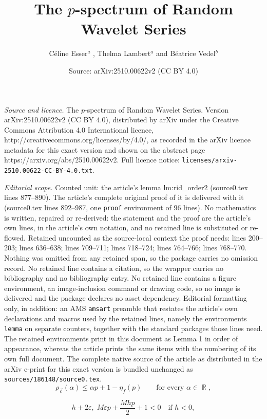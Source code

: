 \documentclass[10pt,a4paper]{amsart}
\title{The $p$-spectrum of Random Wavelet Series}
\author{C\'eline Esser$^a$ , Thelma Lambert$^a$ and B\'eatrice Vedel$^b$}
\date{Source: arXiv:2510.00622v2 (CC BY 4.0)}
\DeclareMathOperator{\R}{\mathbb{R}}
\begin{document}
\maketitle

\noindent\emph{Source and licence.} The $p$-spectrum of Random Wavelet Series. Version arXiv:2510.00622v2 (CC BY 4.0), distributed by arXiv under the Creative Commons Attribution 4.0 International licence, http://creativecommons.org/licenses/by/4.0/, as recorded in the arXiv licence metadata for this exact version and shown on the abstract page https://arxiv.org/abs/2510.00622v2. Full licence notice: \texttt{licenses/arxiv-2510.00622-CC-BY-4.0.txt}.\par\smallskip

\noindent\textit{Editorial scope.} Counted unit: the article's lemma lm:rid\_order2 (source0.tex lines 877--890). The article's complete original proof of it is delivered with it (source0.tex lines 892--987, one \texttt{proof} environment of 96 lines). No mathematics is written, repaired or re-derived: the statement and the proof are the article's own lines, in the article's own notation, and no retained line is substituted or re-flowed.  Retained uncounted as the source-local context the proof needs: lines 200--203; lines 636--638; lines 709--711; lines 718--724; lines 764--766; lines 768--770.  Nothing was omitted from any retained span, so the package carries no omission record.  No retained line contains a citation, so the wrapper carries no bibliography and no bibliography entry.  No retained line contains a figure environment, an image-inclusion command or drawing code, so no image is delivered and the package declares no asset dependency.  Editorial formatting only, in addition: an AMS \texttt{amsart} preamble that restates the article's own declarations and macros used by the retained lines, namely the environments \texttt{lemma} on separate counters, together with the standard packages those lines need.  The retained environments print in this document as Lemma 1 in order of appearance, whereas the article prints the same items with the numbering of its own full document.  The complete native source of the article as distributed in the arXiv e-print for this exact version is bundled unchanged as \texttt{sources/186148/source0.tex}.
\begin{equation}\label{eq:bound_rho}
    \rho_{\vec{c}}(\alpha) \leq \alpha p+1 -\eta_f(p)
\qquad \text{for every }\alpha\in\R,
\end{equation}

\begin{equation}\label{eq:epsilon_neg}
    h+2\varepsilon ,\; M\varepsilon p +\frac{Mhp}{2}+1<0 \quad\text{if }h<0, 
\end{equation}
\end{document}
